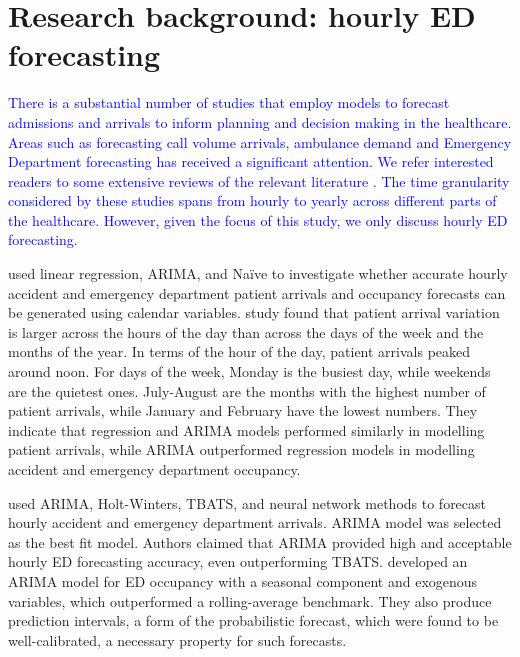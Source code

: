 \documentclass[]{elsarticle} %
\begin{document}
\hypertarget{lit}{%
\section{Research background: hourly ED forecasting}\label{lit}}

\textcolor{blue}{
There is a substantial number of studies that employ models to forecast admissions and arrivals to inform planning and decision making in the healthcare. Areas such as forecasting call volume arrivals, ambulance demand and Emergency Department forecasting has received a significant attention. We refer interested readers to  some extensive reviews of the relevant literature} \citep{mingliterature2022, gul2020review, ibrahim2016modeling}. \textcolor{blue}{The time granularity considered by these studies spans from hourly to yearly across different parts of the healthcare. However, given
the focus of this study, we only discuss hourly ED forecasting.}

\citet{hertzum2017forecasting} used linear regression, ARIMA, and Naïve to
investigate whether accurate hourly accident and emergency department
patient arrivals and occupancy forecasts can be generated using calendar
variables. \citet{hertzum2017forecasting} study found that patient arrival
variation is larger across the hours of the day than across the days of
the week and the months of the year. In terms of the hour of the day,
patient arrivals peaked around noon. For days of the week, Monday is the
busiest day, while weekends are the quietest ones. July-August are the
months with the highest number of patient arrivals, while January and
February have the lowest numbers. They indicate that regression and
ARIMA models performed similarly in modelling patient arrivals, while
ARIMA outperformed regression models in modelling accident and emergency
department occupancy.

\citet{choudhury2020forecasting} used ARIMA, Holt-Winters, TBATS, and neural
network methods to forecast hourly accident and emergency department
arrivals. ARIMA model was selected as the best fit model. Authors
claimed that ARIMA provided high and acceptable hourly ED forecasting
accuracy, even outperforming TBATS. \citet{Cheng2021} developed an ARIMA model
for ED occupancy with a seasonal component and exogenous variables,
which outperformed a rolling-average benchmark. They also produce
prediction intervals, a form of the probabilistic forecast, which were
found to be well-calibrated, a necessary property for such forecasts.
\end{document}
